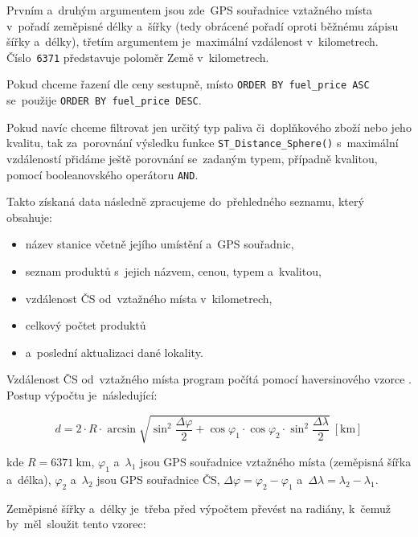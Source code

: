 Prvním a~druhým argumentem jsou zde~GPS souřadnice vztažného místa v~pořadí
zeměpisné délky a~šířky (tedy obrácené pořadí oproti běžnému zápisu šířky
a~délky), třetím argumentem je~maximální vzdálenost v~kilometrech.
Číslo~\texttt{6371} představuje poloměr Země v~kilometrech.

Pokud chceme řazení dle ceny sestupně, místo \texttt{ORDER BY fuel\_price ASC}
se~použije \texttt{ORDER BY fuel\_price DESC}.

Pokud navíc chceme filtrovat jen určitý typ paliva či~doplňkového zboží nebo
jeho kvalitu, tak za~porovnání výsledku funkce \texttt{ST\_Distance\_Sphere()}
s~maximální vzdáleností přidáme ještě porovnání se~zadaným typem, případně
kvalitou, pomocí booleanovského operátoru \texttt{AND}.

Takto získaná data následně zpracujeme do~přehledného seznamu, který obsahuje:

\begin{itemize}
    \item název stanice včetně jejího umístění a~GPS souřadnic,
    \item seznam produktů s~jejich názvem, cenou, typem a~kvalitou,
    \item vzdálenost ČS od~vztažného místa v~kilometrech,
    \item celkový počtet produktů
    \item a~poslední aktualizaci dané lokality.
\end{itemize}

Vzdálenost ČS od~vztažného místa program počítá pomocí haversinového vzorce
\cite{Gade2010}. %
Postup výpočtu je~následující:

\begin{equation}
    \label{eq:haversine-formula}
        d   =   2 \cdot R \cdot \arcsin \sqrt{
                    \sin^2 \frac{\Delta\varphi}{2} +
                    \cos \varphi_1 \cdot \cos \varphi_2 \cdot
                    \sin^2 \frac{\Delta\lambda}{2}
                }~[\text{km}]
\end{equation}

kde \(R = 6371~\text{km}\), \(\varphi_1\) a~\(\lambda_1\) jsou GPS souřadnice
vztažného místa (zeměpisná šířka a~délka), \(\varphi_2\) a~\(\lambda_2\)
jsou GPS souřadnice ČS, \(\Delta\varphi = \varphi_2 - \varphi_1\)
a~\(\Delta\lambda = \lambda_2 - \lambda_1\).

Zeměpisné šířky a~délky je~třeba před výpočtem převést na radiány, k~čemuž
by~měl~sloužit tento vzorec:

